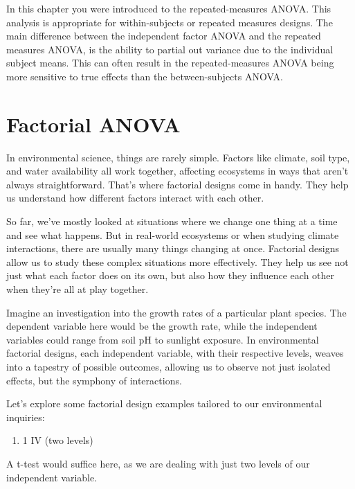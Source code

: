 \documentclass[
  letterpaper,
  DIV=11,
  numbers=noendperiod]{scrreprt}
\providecommand{\tightlist}{%
  \setlength{\itemsep}{0pt}\setlength{\parskip}{0pt}}\usepackage{longtable,booktabs,array}
\begin{document}
In this chapter you were introduced to the repeated-measures ANOVA. This
analysis is appropriate for within-subjects or repeated measures
designs. The main difference between the independent factor ANOVA and
the repeated measures ANOVA, is the ability to partial out variance due
to the individual subject means. This can often result in the
repeated-measures ANOVA being more sensitive to true effects than the
between-subjects ANOVA.


\chapter{Factorial ANOVA}\label{factorial-anova}

In environmental science, things are rarely simple. Factors like
climate, soil type, and water availability all work together, affecting
ecosystems in ways that aren't always straightforward. That's where
factorial designs come in handy. They help us understand how different
factors interact with each other.

So far, we've mostly looked at situations where we change one thing at a
time and see what happens. But in real-world ecosystems or when studying
climate interactions, there are usually many things changing at once.
Factorial designs allow us to study these complex situations more
effectively. They help us see not just what each factor does on its own,
but also how they influence each other when they're all at play
together.

Imagine an investigation into the growth rates of a particular plant
species. The dependent variable here would be the growth rate, while the
independent variables could range from soil pH to sunlight exposure. In
environmental factorial designs, each independent variable, with their
respective levels, weaves into a tapestry of possible outcomes, allowing
us to observe not just isolated effects, but the symphony of
interactions.

Let's explore some factorial design examples tailored to our
environmental inquiries:

\begin{enumerate}
\def\labelenumi{\arabic{enumi}.}
\tightlist
\item
  1 IV (two levels)
\end{enumerate}

A t-test would suffice here, as we are dealing with just two levels of
our independent variable.
\end{document}
